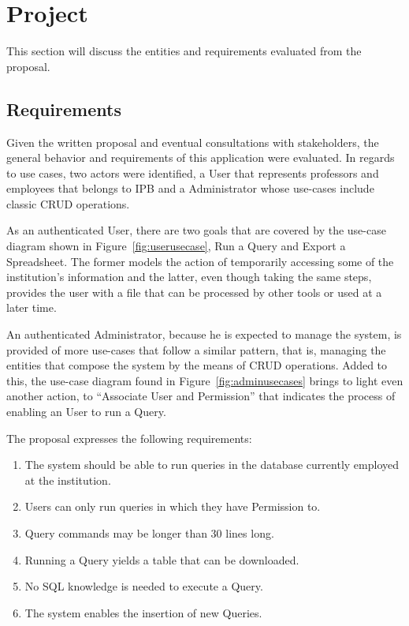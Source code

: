 \chapter{Project}

This section will discuss the entities and requirements evaluated from the proposal.

\section{Requirements}
Given the written proposal and eventual consultations with stakeholders, the general behavior and requirements of this application were evaluated. In regards to use cases, two actors were identified, a User that represents professors and employees that belongs to \gls{IPB} and a Administrator whose use-cases include classic \gls{CRUD} operations.

As an authenticated User, there are two goals that are covered by the use-case diagram shown in Figure~\ref{fig:userusecase}, Run a Query and Export a Spreadsheet. The former models the action of temporarily accessing some of the institution's information and the latter, even though taking the same steps, provides the user with a file that can be processed by other tools or used at a later time.

An authenticated Administrator, because he is expected to manage the system, is provided of more use-cases that follow a similar pattern, that is, managing the entities that compose the system by the means of \gls{CRUD} operations. Added to this, the use-case diagram found in Figure~\ref{fig:adminusecases} brings to light even another action, to ``Associate User and Permission'' that indicates the process of enabling an User to run a Query.

The proposal expresses the following requirements:
\begin{enumerate}
\item The system should be able to run queries in the database currently employed at the institution.\label{req:multidb}
\item Users can only run queries in which they have Permission to.\label{req:permission}
\item Query commands may be longer than 30 lines long.\label{req:longquery}
\item Running a Query yields a table that can be downloaded.\label{req:download}
\item No \gls{SQL} knowledge is needed to execute a Query.\label{req:noknowledge}
\item The system enables the insertion of new Queries.\label{req:addquery}
\end{enumerate}

